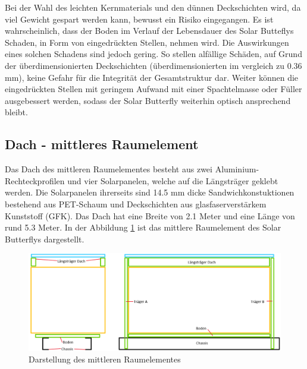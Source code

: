 Bei der Wahl des leichten Kernmaterials und den dünnen Deckschichten wird, da viel Gewicht gespart werden kann, bewusst ein Risiko eingegangen. Es ist wahrscheinlich, dass der Boden im Verlauf der Lebensdauer des Solar Butteflys Schaden, in Form von eingedrückten Stellen, nehmen wird. Die Auswirkungen eines solchen Schadens sind jedoch gering. So stellen alfällige Schäden, auf Grund der überdimensionierten Deckschichten (überdimensionierten im vergleich zu 0.36 mm), keine Gefahr für die Integrität der Gesamtstruktur dar. Weiter können die eingedrückten Stellen mit geringem Aufwand mit einer Spachtelmasse oder Füller ausgebessert werden, sodass der Solar Butterfly weiterhin optisch ansprechend bleibt.

\subsection{Dach - mittleres Raumelement}
\label{sec:Dach}
Das Dach des mittleren Raumelementes besteht aus zwei Aluminium-Rechteckprofilen und vier Solarpanelen, welche auf die Längsträger geklebt werden. Die Solarpanelen ihrerseits sind 14.5 mm dicke Sandwichkonstuktionen bestehend aus PET-Schaum und Deckschichten aus glasfaserverstärkem Kunststoff (GFK). Das Dach hat eine Breite von 2.1 Meter und eine Länge von rund 5.3 Meter. In der Abbildung \ref{img:Dach} ist das mittlere Raumelement des Solar Butterflys dargestellt.\\

\begin{figure}[h]
  \includegraphics[width=\linewidth]{04_Figures/Dach.png}
  \caption{Darstellung des mittleren Raumelementes}
  \label{img:Dach}
\end{figure}

